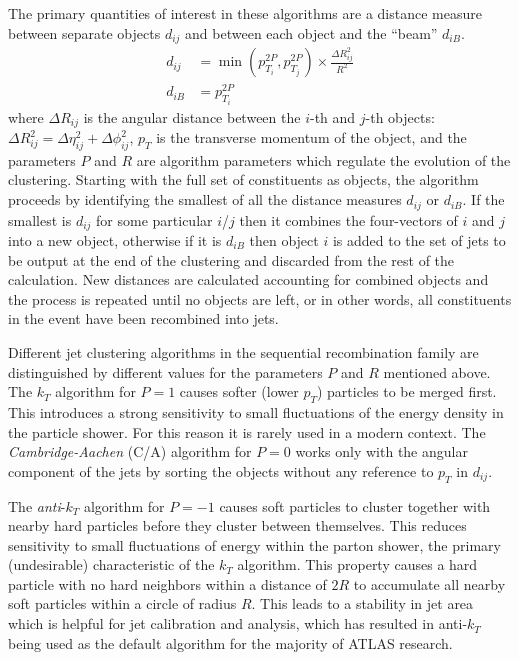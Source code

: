 The primary quantities of interest in these algorithms are a distance measure between separate objects $d_{ij}$ and between each object and the ``beam'' $d_{iB}$.
\begin{align}
d_{ij} &= \min\left({p_{T_i}^{2P}, p_{T_j}^{2P}}\right) \times \frac{\Delta R_{ij}^2}{R^2} \\
d_{iB} &= p_{T_i}^{2P}
\end{align}
where $\Delta R_{ij}$ is the angular distance between the $i$-th and $j$-th objects: $\Delta R_{ij}^2 = \Delta \eta_{ij}^2 + \Delta \phi_{ij}^2$, $p_T$ is the transverse momentum of the object, and the parameters $P$ and $R$ are algorithm parameters which regulate the evolution of the clustering.
Starting with the full set of constituents as objects, the algorithm proceeds by identifying the smallest of all the distance measures $d_{ij}$ or $d_{iB}$.
If the smallest is $d_{ij}$ for some particular $i$/$j$ then it combines the four-vectors of $i$ and $j$ into a new object, otherwise if it is $d_{iB}$ then object $i$ is added to the set of jets to be output at the end of the clustering and discarded from the rest of the calculation.
New distances are calculated accounting for combined objects and the process is repeated until no objects are left, or in other words, all constituents in the event have been recombined into jets.

Different jet clustering algorithms in the sequential recombination family are distinguished by different values for the parameters $P$ and $R$ mentioned above. 
The $k_T$ algorithm \cite{Catani:1993hr} for $P=1$ causes softer (lower $p_T$) particles to be merged first.
This introduces a strong sensitivity to small fluctuations of the energy density in the particle shower.
For this reason it is rarely used in a modern context.
The \textit{Cambridge-Aachen} (C/A) algorithm \cite{Dokshitzer:1997in} for $P=0$ works only with the angular component of the jets by sorting the objects without any reference to $p_T$ in $d_{ij}$.

The \textit{anti}-$k_T$ algorithm \cite{Cacciari:2008gp} for $P = -1$ causes soft particles to cluster together with nearby hard particles before they cluster between themselves. 
This reduces sensitivity to small fluctuations of energy within the parton shower, the primary (undesirable) characteristic of the $k_T$ algorithm.
This property causes a hard particle with no hard neighbors within a distance of $2R$ to accumulate all nearby soft particles within a circle of radius $R$.
This leads to a stability in jet area which is helpful for jet calibration and analysis, which has resulted in anti-$k_T$ being used as the default algorithm for the majority of ATLAS research.

